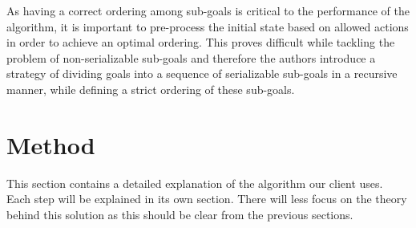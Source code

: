 \documentclass[letterpaper]{article}
\begin{document}
As having a correct ordering among sub-goals is critical to the performance of the algorithm, it is important to pre-process the initial state based on allowed actions in order to achieve an optimal ordering. This proves difficult while tackling the problem of non-serializable sub-goals and therefore the authors introduce a strategy of dividing goals into a sequence of serializable sub-goals in a recursive manner, while defining a strict ordering of these sub-goals.



\section{Method}
This section contains a detailed explanation of the algorithm our client uses. Each step will be explained in its own section. There will less focus on the theory behind this solution as this should be clear from the previous sections.
\end{document}

